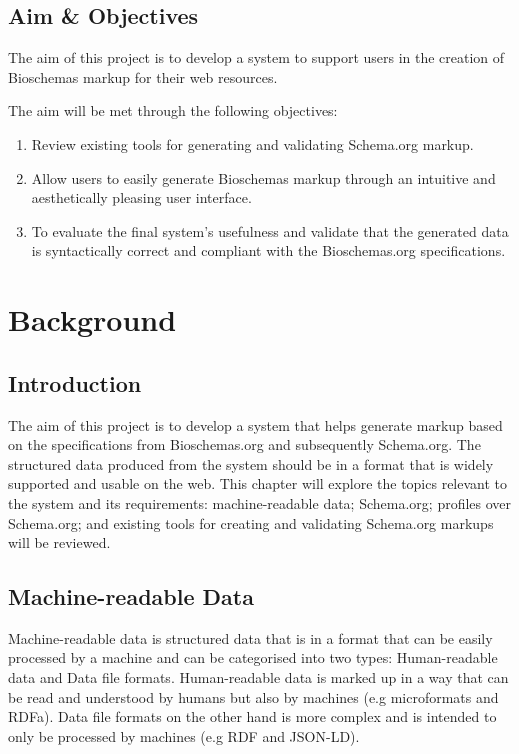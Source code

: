 \section{Aim \& Objectives}
The aim of this project is to develop a system to support users in the creation of Bioschemas markup for their web resources.

\noindent
The aim will be met through the following objectives:
\begin {enumerate}
    \item Review existing tools for generating and validating Schema.org markup.   
    \item Allow users to easily generate Bioschemas markup through an intuitive and aesthetically pleasing user interface.
    \item To evaluate the final system's usefulness and validate that the generated data is syntactically correct and compliant with the Bioschemas.org specifications.
\end{enumerate}

\chapter{Background}
\section{Introduction}
The aim of this project is to develop a system that helps generate markup based on the specifications from Bioschemas.org and subsequently Schema.org. The structured data produced from the system should be in a format that is widely supported and usable on the web. This chapter will explore the topics relevant to the system and its requirements: machine-readable data; Schema.org; profiles over Schema.org; and existing tools for creating and validating Schema.org markups will be reviewed.

\section{Machine-readable Data}
Machine-readable data is structured data that is in a format that can be easily processed by a machine and can be categorised into two types: Human-readable data and Data file formats. Human-readable data is marked up in a way that can be read and understood by humans but also by machines (e.g microformats and RDFa). Data file formats on the other hand is more complex and is intended to only be processed by machines (e.g RDF and JSON-LD). \newline

